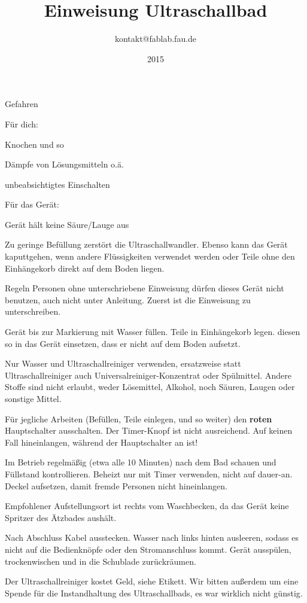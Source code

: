 \documentclass{\basedir/fablab-document}
\date{2015}
\author{kontakt@fablab.fau.de}
\title{Einweisung Ultraschallbad}
\begin{document}
	\maketitle
	
\begin{section}{Gefahren}

Für dich:

 Knochen und so

Dämpfe von Lösungsmitteln o.ä.

unbeabsichtigtes Einschalten


Für das Gerät:

Gerät hält keine Säure/Lauge aus

Zu geringe Befüllung zerstört die Ultraschallwandler. Ebenso kann das Gerät kaputtgehen, wenn andere Flüssigkeiten verwendet werden oder Teile ohne den Einhängekorb direkt auf dem Boden liegen.

\end{section}


\begin{section}{Regeln}
Personen ohne unterschriebene Einweisung dürfen dieses Gerät nicht benutzen, auch nicht unter Anleitung. Zuerst ist die Einweisung zu unterschreiben.

Gerät bis zur Markierung mit Wasser füllen. Teile in Einhängekorb legen. diesen so in das Gerät einsetzen, dass er nicht auf dem Boden aufsetzt.

Nur Wasser und Ultraschallreiniger verwenden, ersatzweise statt Ultraschallreiniger auch Universalreiniger-Konzentrat oder Spülmittel. Andere Stoffe sind nicht erlaubt, weder Lösemittel, Alkohol, noch Säuren, Laugen oder sonstige Mittel.

Für jegliche Arbeiten (Befüllen, Teile einlegen, und so weiter) den \textbf{roten} Hauptschalter ausschalten. Der Timer-Knopf ist nicht ausreichend. Auf keinen Fall hineinlangen, während der Hauptschalter an ist!

Im Betrieb regelmäßig (etwa alle 10 Minuten) nach dem Bad schauen und Füllstand kontrollieren. Beheizt nur mit Timer verwenden, nicht auf dauer-an. Deckel aufsetzen, damit fremde Personen nicht hineinlangen.

Empfohlener Aufstellungsort ist rechts vom Waschbecken, da das Gerät keine Spritzer des Ätzbades aushält.

Nach Abschluss Kabel ausstecken. Wasser nach links hinten ausleeren, sodass es nicht auf die Bedienknöpfe oder den Stromanschluss kommt. Gerät ausspülen, trockenwischen und in die Schublade zurückräumen.

Der Ultraschallreiniger kostet Geld, siehe Etikett. Wir bitten außerdem um eine Spende für die Instandhaltung des Ultraschallbads, es war wirklich nicht günstig.
\end{section}
\end{document}
